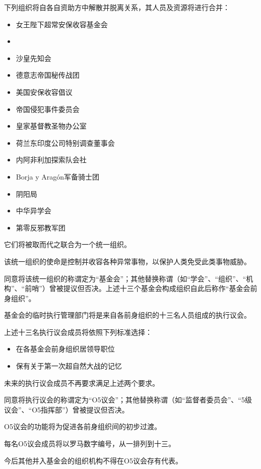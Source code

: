 \begin{whiteboxbb}

下列组织将自各自资助方中解散并脱离关系，其人员及资源将进行合并：

\begin{itemize}
\item 女王陛下超常安保收容基金会
\item {}
\item 沙皇先知会
\item 德意志帝国秘传战团
\item 美国安保收容倡议
\item 帝国侵犯事件委员会
\item 皇家基督教圣物办公室
\item 荷兰东印度公司特别调查董事会
\item 内阿非利加探索队会社
\item Borja y Aragón军备骑士团
\item 阴阳局
\item 中华异学会
\item 第零反邪教军团
\end{itemize}

它们将被取而代之联合为一个统一组织。

该统一组织的使命是控制并收容各种异常事物，以保护人类免受此类事物威胁。

同意将该统一组织的称谓定为“基金会”；其他替换称谓（如“学会”、“组织”、“机构”、“前哨”）曾被提议但否决。上述十三个基金会构成组织自此后称作“基金会前身组织”。

\end{whiteboxbb}


\begin{whiteboxbb}

基金会的临时执行管理部门将是来自各前身组织的十三名人员组成的执行议会。

上述十三名执行议会成员将依照下列标准选择：

\begin{itemize}

\item 在各基金会前身组织居领导职位
\item 保有关于第一次超自然大战的记忆

\end{itemize}

未来的执行议会成员不再要求满足上述两个要求。

同意将执行议会的称谓定为“O5议会”；其他替换称谓（如“监督者委员会”、“5级议会”、“O5指挥部”）曾被提议但否决。

O5议会的功能将为促进各前身组织间的初步过渡。

每名O5议会成员将以罗马数字编号，从一排列到十三。

今后其他并入基金会的组织机构不得在O5议会存有代表。

\end{whiteboxbb}

